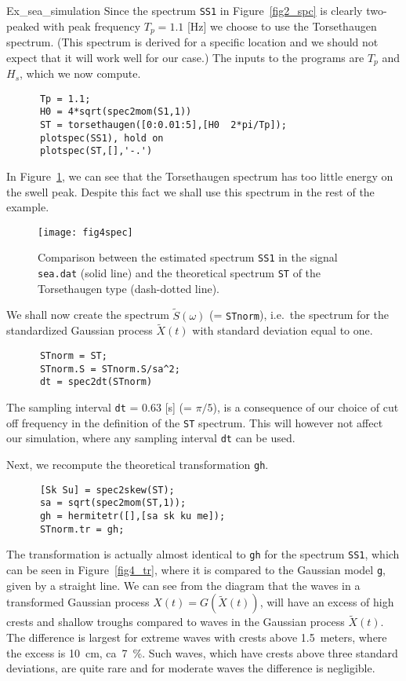 \begin{cex}{Ex_sea_simulation}
Since the spectrum {\tt SS1} in Figure~\ref{fig2_spc}
is clearly two-peaked with peak frequency
$T_p = 1.1$ [Hz] we choose to use the Torsethaugen spectrum.
(This spectrum is derived for a specific location and we should not
expect that it will work well for our case.) The inputs to the programs are
$T_p$ and $H_s$, which we now compute.
{\small\begin{verbatim}
      Tp = 1.1;
      H0 = 4*sqrt(spec2mom(S1,1))
      ST = torsethaugen([0:0.01:5],[H0  2*pi/Tp]);
      plotspec(SS1), hold on
      plotspec(ST,[],'-.')
\end{verbatim}}
\noindent
In Figure~\ref{fig4-12}, we can see that the Torsethaugen spectrum
has too little energy on the swell peak. Despite this fact we shall use
this spectrum in the rest of the example.
\begin{figure}
\centering
\texttt{[image: fig4spec]}
\vspace{-3mm}
\caption[Comparison between spectra of
{\tt sea.dat}]{
Comparison between the estimated spectrum {\tt SS1} in the signal
{\tt sea.dat} (solid line) and the theoretical spectrum {\tt ST} of the
Torsethaugen type (dash-dotted line).
}
\label{fig4-12}
\end{figure}

We shall now create the spectrum $\tilde S(\omega)$ (= {\tt STnorm}),
i.e.\ the
spectrum for the standardized Gaussian process ${\widetilde X}(t)$ with
standard deviation equal to one.
{\small\begin{verbatim}
      STnorm = ST;
      STnorm.S = STnorm.S/sa^2;
      dt = spec2dt(STnorm)
\end{verbatim}}
The sampling interval {\tt dt} = 0.63 [s] (= $\pi / 5$),
is a consequence of our choice of
cut off frequency in the definition of the {\tt ST} spectrum.
This will however not affect our simulation, where any sampling interval
{\tt dt} can be used.

Next, we recompute the theoretical transformation {\tt gh}.
{\small\begin{verbatim}
      [Sk Su] = spec2skew(ST);
      sa = sqrt(spec2mom(ST,1));
      gh = hermitetr([],[sa sk ku me]);
      STnorm.tr = gh;
\end{verbatim}}

\noindent
The transformation is actually almost identical to {\tt gh} for
the spectrum {\tt SS1}, which can be seen in Figure~\ref{fig4_tr},
where it is compared to the Gaussian model {\tt g},
given by a straight line. We can see from the diagram that
the waves in a transformed Gaussian process $X(t)=G({\widetilde X}(t))$,
will have an excess of high crests and shallow troughs compared to
waves in the Gaussian process $\widetilde X(t)$. The difference is
largest for extreme waves with crests above 1.5~meters, where
the excess is 10~cm, ca~7~\%.
Such waves, which have crests above three standard deviations,
are quite rare and for moderate waves the difference is negligible.


\end{cex}
